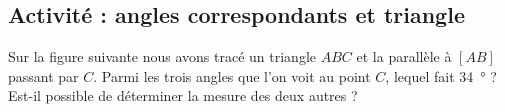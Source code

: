 
\subsection*{Activité : angles correspondants et triangle}

Sur la figure suivante nous avons tracé un triangle \( ABC\) et la parallèle à \( [AB]\) passant par \( C\). Parmi les trois angles que l'on voit au point \( C\), lequel fait \SI{34}{\degree} ? Est-il possible de déterminer la mesure des deux autres ?

\begin{center}
   
\end{center}
